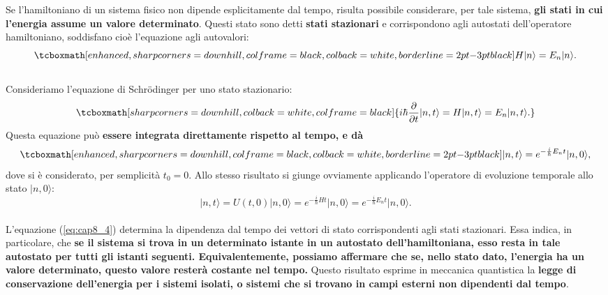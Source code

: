 \documentclass[a4paper,12pt,oneside]{book}
\begin{document}
Se l'hamiltoniano di un sistema fisico non dipende esplicitamente dal tempo, risulta possibile considerare, per tale sistema, \textbf{gli stati in cui l'energia assume un valore determinato}. Questi stato sono detti \textbf{stati stazionari} e corrispondono agli autostati dell'operatore hamiltoniano, soddisfano cioè l'equazione agli autovalori:
	\begin{equation}
		\tcboxmath[enhanced, sharp corners=downhill, colframe=black, colback=white, borderline={2pt}{-3pt}{black}]{
			H|n\rangle = E_n |n \rangle.
			}
	\end{equation}\\
	
Consideriamo l'equazione di Schr\"{o}dinger per uno stato stazionario:
	\begin{equation}
		\tcboxmath[sharp corners=downhill, colback=white, colframe=black]{
			i\hbar \frac{\partial}{\partial t}|n,t\rangle = H |n,t \rangle = E_n |n, t \rangle.
			}
	\end{equation}
Questa equazione può \textbf{essere integrata direttamente rispetto al tempo, e dà}
	\begin{equation}
		\tcboxmath[enhanced, sharp corners=downhill, colframe=black, colback=white, borderline={2pt}{-3pt}{black}]{	
			|n,t\rangle = e^{-\frac{i}{\hbar}E_n t}\vert n, 0\rangle,
			}
	\label{eq:cap8_4}
	\end{equation}
dove si è considerato, per semplicità $t_0=0$. Allo stesso risultato si giunge ovviamente applicando l'operatore di evoluzione temporale allo stato $\vert n, 0\rangle$:
	\begin{equation}
		\vert n, t \rangle = U(t,0) \vert n, 0 \rangle = e^{-\frac{i}{\hbar}H t}\vert n, 0\rangle= e^{-\frac{i}{\hbar}E_n t}\vert n, 0\rangle.
	\end{equation}\\

L'equazione (\ref{eq:cap8_4}) determina la dipendenza dal tempo dei vettori di stato corrispondenti agli stati stazionari. Essa indica, in particolare, che \textbf{se il sistema si trova in un determinato istante in un autostato dell'hamiltoniana, esso resta in tale autostato per tutti gli istanti seguenti. Equivalentemente, possiamo affermare che se, nello stato dato, l'energia ha un valore determinato, questo valore resterà costante nel tempo.} Questo risultato esprime in meccanica quantistica la \textbf{legge di conservazione dell'energia per i sistemi isolati, o sistemi che si trovano in campi esterni non dipendenti dal tempo}.\\
\end{document}
